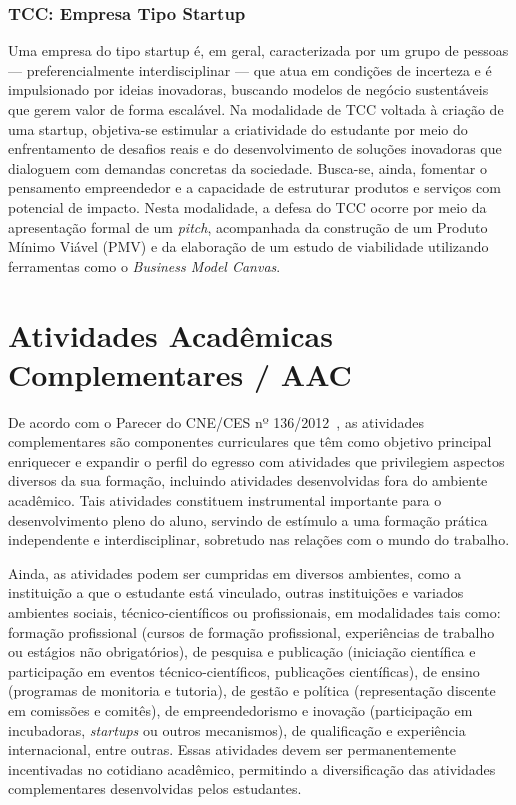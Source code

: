 \subsubsection{TCC: Empresa Tipo Startup}

Uma empresa do tipo startup é, em geral, caracterizada por um grupo de pessoas — preferencialmente interdisciplinar — que atua em condições de incerteza e é impulsionado por ideias inovadoras, buscando modelos de negócio sustentáveis que gerem valor de forma escalável. Na modalidade de TCC voltada à criação de uma startup, objetiva-se estimular a criatividade do estudante por meio do enfrentamento de desafios reais e do desenvolvimento de soluções inovadoras que dialoguem com demandas concretas da sociedade. Busca-se, ainda, fomentar o pensamento empreendedor e a capacidade de estruturar produtos e serviços com potencial de impacto. Nesta modalidade, a defesa do TCC ocorre por meio da apresentação formal de um \textit{pitch}, acompanhada da construção de um Produto Mínimo Viável (PMV) e da elaboração de um estudo de viabilidade utilizando ferramentas como o \textit{Business Model Canvas}.

\section{Atividades Acadêmicas Complementares / AAC}
\label{sec:AAC}

De acordo com o Parecer do CNE/CES nº 136/2012~\cite{MEC:CNE:CES:136:2012}, as atividades complementares são componentes curriculares que têm como objetivo principal enriquecer e expandir o perfil do egresso com atividades que privilegiem aspectos diversos da sua formação, incluindo atividades desenvolvidas fora do ambiente acadêmico. Tais atividades constituem instrumental importante para o desenvolvimento pleno do aluno, servindo de estímulo a uma formação prática independente e interdisciplinar, sobretudo nas relações com o mundo do trabalho.

Ainda, as atividades podem ser cumpridas em diversos ambientes, como a instituição a que o estudante está vinculado, outras instituições e variados ambientes sociais, técnico-científicos ou profissionais, em modalidades tais como: formação profissional (cursos de formação profissional, experiências de trabalho ou estágios não obrigatórios), de pesquisa e publicação (iniciação científica e participação em eventos técnico-científicos, publicações científicas), de ensino (programas de monitoria e tutoria), de gestão e política (representação discente em comissões e comitês), de empreendedorismo e inovação (participação em incubadoras, \textit{startups} ou outros mecanismos), de qualificação e experiência internacional, entre outras. Essas atividades devem ser permanentemente incentivadas no cotidiano acadêmico, permitindo a diversificação das atividades complementares desenvolvidas pelos estudantes.

